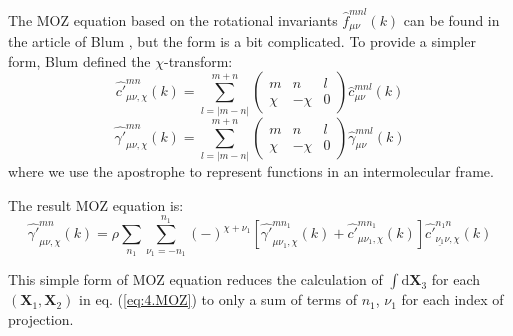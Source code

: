 The \acs{MOZ} equation based on the rotational invariants $\hat{f}_{\mu\nu}^{mnl}(k)$
can be found in the article of Blum \citep{Blum_I}, but the form
is a bit complicated. To provide a simpler form, Blum defined the $\chi$-transform:
\begin{equation}
\hat{c'}_{\mu\nu,\chi}^{mn}(k)=\sum_{l=\left|m-n\right|}^{m+n}\left(\begin{array}{ccc}
m & n & l\\
\chi & -\chi & 0
\end{array}\right)\hat{c}_{\mu\nu}^{mnl}(k)
\end{equation}
\begin{equation}
\hat{\gamma'}_{\mu\nu,\chi}^{mn}(k)=\sum_{l=\left|m-n\right|}^{m+n}\left(\begin{array}{ccc}
m & n & l\\
\chi & -\chi & 0
\end{array}\right)\hat{\gamma}_{\mu\nu}^{mnl}(k)
\end{equation}
where we use the apostrophe to represent functions in an intermolecular
frame. 

The result \acs{MOZ} equation is:
\begin{equation}
\hat{\gamma'}_{\mu\nu,\chi}^{mn}(k)=\rho\sum_{n_{1}}\sum_{\nu_{1}=-n_{1}}^{n_{1}}(-)^{\chi+\nu_{1}}\left[\hat{\gamma'}_{\mu\nu_{1},\chi}^{mn_{1}}(k)+\hat{c'}_{\mu\nu_{1},\chi}^{mn_{1}}(k)\right]\hat{c'}_{\underline{\nu_{1}}\nu,\chi}^{n_{1}n}(k)
\end{equation}

This simple form of \acs{MOZ} equation reduces the calculation of
$\int\mathrm{d}\mathbf{X}_{3}$ for each $(\mathbf{X}_{1},\mathbf{X}_{2})$
in eq. (\ref{eq:4.MOZ}) to only a sum of terms of $n_{1}$, $\nu_{1}$
for each index of projection.
